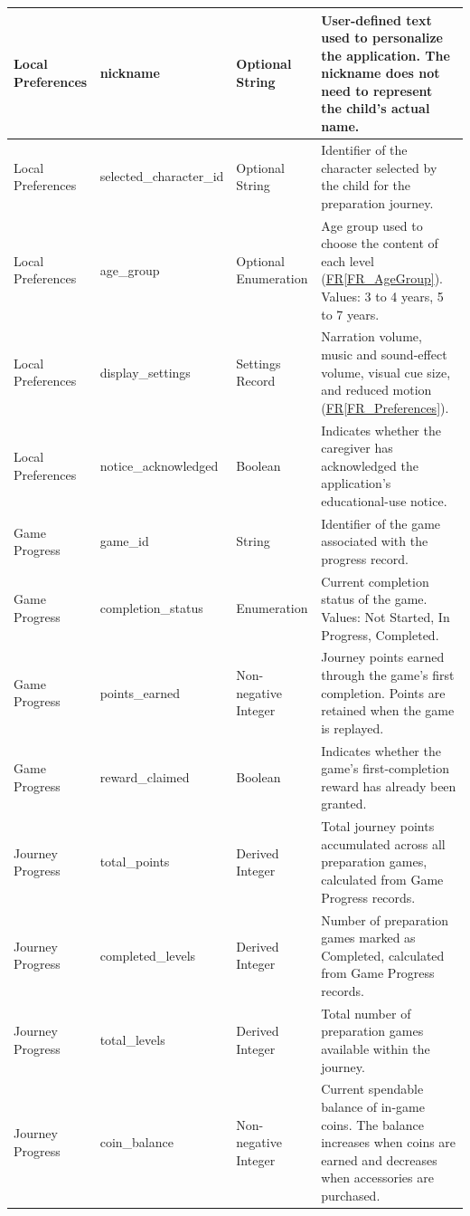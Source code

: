 \documentclass[10pt]{article}
\newcommand{\rref}[1]{\hyperref[#1]{FR\ref*{#1}}}
\begin{document}
\begin{longtable}{
    p{}
    p{}
    p{}
    p{}
}
Local Preferences &
nickname &
Optional String &
User-defined text used to personalize the
application. The nickname does not need to
represent the child's actual name. \\
\midrule

Local Preferences &
selected\_character\_id &
Optional String &
Identifier of the character selected by the child
for the preparation journey. \\
\midrule

Local Preferences &
age\_group &
Optional Enumeration &
Age group used to choose the content of each
level (\rref{FR_AgeGroup}). Values: 3 to 4 years,
5 to 7 years. \\
\midrule

Local Preferences &
display\_settings &
Settings Record &
Narration volume, music and sound-effect volume,
visual cue size, and reduced motion
(\rref{FR_Preferences}). \\
\midrule

Local Preferences &
notice\_acknowledged &
Boolean &
Indicates whether the caregiver has acknowledged
the application's educational-use notice. \\
\midrule

Game Progress &
game\_id &
String &
Identifier of the game associated with the
progress record. \\
\midrule

Game Progress &
completion\_status &
Enumeration &
Current completion status of the game.
Values: Not Started, In Progress, Completed. \\
\midrule

Game Progress &
points\_earned &
Non-negative Integer &
Journey points earned through the game's
first completion. Points are retained
when the game is replayed. \\
\midrule

Game Progress &
reward\_claimed &
Boolean &
Indicates whether the game's first-completion
reward has already been granted. \\
\midrule

Journey Progress &
total\_points &
Derived Integer &
Total journey points accumulated across all
preparation games, calculated from Game
Progress records. \\
\midrule

Journey Progress &
completed\_levels &
Derived Integer &
Number of preparation games marked as
Completed, calculated from Game Progress
records. \\
\midrule

Journey Progress &
total\_levels &
Derived Integer &
Total number of preparation games available
within the journey. \\
\midrule

Journey Progress &
coin\_balance &
Non-negative Integer &
Current spendable balance of in-game coins.
The balance increases when coins are earned
and decreases when accessories are purchased. \\

\end{longtable}
\end{document}
